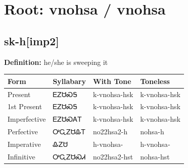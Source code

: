 \documentclass{article}%
\begin{document}
%
\normalsize%
\section*{Root: vnohsa / vnohsa}%
\subsection*{sk-h[imp2]}%
\textbf{Definition: }%
he/she is sweeping it%
\\[0.5em]%
\begin{tabular}{|l|l|l|l|}%
\hline%
\textbf{Form}&\textbf{Syllabary}&\textbf{With Tone}&\textbf{Toneless}\\%
\hline%
Present&ᎬᏃᏌᏍᎦ&k{-}vnohsa{-}hsk&k{-}vnohsa{-}hsk\\%
1st Present&ᎬᏃᏌᏍᎦ&k{-}vnohsa{-}hsk&k{-}vnohsa{-}hsk\\%
Imperfective&ᎬᏃᏌᏍᎪᎢ&k{-}vnohsa{-}hsk&k{-}vnohsa{-}hsk\\%
Perfective&ᎤᏩᏃᏌᎲᎢ&no22hsa2{-}h&nohsa{-}h\\%
Imperative&ᎲᏃᏌ&h{-}vnohsa{-}&h{-}vnohsa{-}\\%
Infinitive&ᎤᏩᏃᏌᏍᏗ&no22hsa2{-}hst&nohsa{-}hst\\%
\hline%
\end{tabular}%
\\[1em]%
\end{document}
